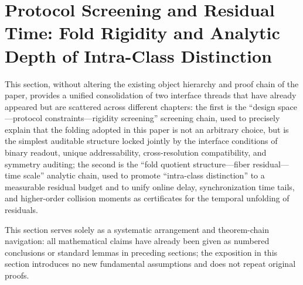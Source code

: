 \section{Protocol Screening and Residual Time: Fold Rigidity and Analytic Depth of Intra-Class Distinction}\label{sec:fold-residual-time}

This section, without altering the existing object hierarchy and proof chain of the paper, provides a unified consolidation of two interface threads that have already appeared but are scattered across different chapters: the first is the ``design space---protocol constraints---rigidity screening'' screening chain, used to precisely explain that the folding adopted in this paper is not an arbitrary choice, but is the simplest auditable structure locked jointly by the interface conditions of binary readout, unique addressability, cross-resolution compatibility, and symmetry auditing; the second is the ``fold quotient structure---fiber residual---time scale'' analytic chain, used to promote ``intra-class distinction'' to a measurable residual budget and to unify online delay, synchronization time tails, and higher-order collision moments as certificates for the temporal unfolding of residuals.\par
This section serves solely as a systematic arrangement and theorem-chain navigation: all mathematical claims have already been given as numbered conclusions or standard lemmas in preceding sections; the exposition in this section introduces no new fundamental assumptions and does not repeat original proofs.






